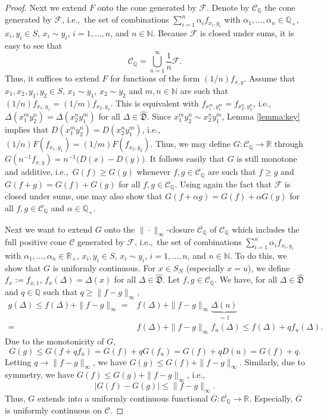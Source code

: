 \documentclass[12pt,a4paper,reqno]{amsart}
\theoremstyle{definition}
\newcommand{\mc}[1]{\mathcal{#1}}
\newcommand{\mf}[1]{\mathfrak{#1}}
\newcommand{\N}{\mathbb N}
\newcommand{\R}{\mathbb R}
\newcommand{\Q}{\mathbb Q}
\begin{document}
\begin{proof}
Next we extend $F$ onto the cone generated by $\mc F$. Denote by $\mc C_\Q$ the cone generated by $\mc F$, i.e.,\ the set of combinations $\sum_{i=1}^n \alpha_i f_{x_i,y_i}$ with $\alpha_1,\ldots,\alpha_n\in\Q_+$, $x_i,y_i\in S$, $x_i\sim y_i$, $i=1,\ldots,n$, and $n\in\N$. Because $\mc F$ is closed under sums, it is easy to see that
$$
\mc C_\Q=\bigcup_{n=1}^\infty \frac{1}{n}\mc F.
$$
Thus, it suffices to extend $F$ for functions of the form $(1/n)f_{x,y}$. Assume that $x_1,x_2,y_1,y_2\in S$, $x_1\sim y_1$, $x_2\sim y_2$ and $m,n\in\N$ are such that $(1/n)f_{x_1,y_1}=(1/m)f_{x_2,y_2}$. This is equivalent with $f_{x_1^m,y_1^m}=f_{x_2^n,y_2^n}$, i.e.,\ $\Delta(x_1^my_2^n)=\Delta(x_2^ny_1^m)$ for all $\Delta\in\hat{\mf D}$. Since $x_1^my_2^n\sim x_2^ny_1^m$, Lemma \ref{lemma:key} implies that $D(x_1^my_2^n)=D(x_2^ny_1^m)$, i.e.,\ $(1/n)F(f_{x_1,y_1})=(1/m)F(f_{x_2,y_2})$. Thus, we may define $G:\mc C_\Q\to\R$ through $G(n^{-1}f_{x,y})=n^{-1}\big(D(x)-D(y)\big)$. It follows easily that $G$ is still monotone and additive, i.e.,\ $G(f)\geq G(g)$ whenever $f,g\in\mc C_\Q$ are such that $f\geq g$ and $G(f+g)=G(f)+G(g)$ for all $f,g\in\mc C_\Q$. Using again the fact that $\mc F$ is closed under sums, one may also show that $G(f+\alpha g)=G(f)+\alpha G(g)$ for all $f,g\in\mc C_\Q$ and $\alpha\in\Q_+$.

Next we want to extend $G$ onto the $\|\cdot\|_\infty$-closure $\overline{\mc C_\Q}$ of $\mc C_\Q$ which includes the full positive cone $\mc C$ generated by $\mc F$, i.e.,\ the set of combinations $\sum_{i=1}^n \alpha_i f_{x_i,y_i}$ with $\alpha_1,\ldots,\alpha_n\in\R_+$, $x_i,y_i\in S$, $x_i\sim y_i$, $i=1,\ldots,n$, and $n\in\N$. To do this, we show that $G$ is uniformly continuous. For $x\in S_N$ (especially $x=u$), we define $f_x:=f_{x,1}$, $f_x(\Delta)=\Delta(x)$ for all $\Delta\in\hat{\mf D}$. Let $f,g\in\mc C_\Q$. We have, for all $\Delta\in\hat{\mf D}$ and $q\in\Q$ such that $q\geq\|f-g\|_\infty$,
\begin{align*}
g(\Delta)\leq f(\Delta)+\|f-g\|_\infty=&f(\Delta)+\|f-g\|_\infty\underbrace{\Delta(u)}_{=1}\\
=&f(\Delta)+\|f-g\|_\infty f_u(\Delta)\leq f(\Delta)+qf_u(\Delta).
\end{align*}
Due to the monotonicity of $G$,
$$
G(g)\leq G(f+qf_u)=G(f)+qG(f_u)=G(f)+qD(u)=G(f)+q.
$$
Letting $q\to\|f-g\|_\infty$, we have $G(g)\leq G(f)+\|f-g\|_\infty$. Similarly, due to symmetry, we have $G(f)\leq G(g)+\|f-g\|_\infty$, i.e.,
$$
|G(f)-G(g)|\leq\|f-g\|_\infty.
$$
Thus, $G$ extends into a uniformly continuous functional $\overline{G}:\overline{\mc C_\Q}\to\R$. Especially, $\overline{G}$ is uniformly continuous on $\mc C$.


\end{proof}
\end{document}
